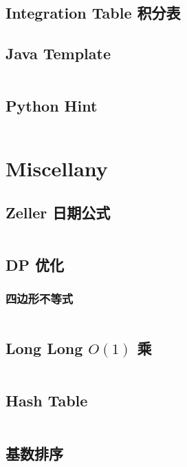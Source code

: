 \documentclass[titlepage, a4paper]{article}
\newcommand\nothing{}
\renewcommand{\checkmark}[0]{\nothing}
\begin{document}
\begin{multicols}{2}
\begin{spacing}{0.6}
\begin{spacing}{0.5}
				\subsection{Integration Table 积分表}
				
				\subsection{Java Template}
				\inputminted{java}{src/Miscellany/Main.java}
				\subsection{Python Hint}
				\inputminted{python}{src/Miscellany/py.py}
				\end{spacing}

			\section{Miscellany}
				\subsection{Zeller 日期公式\checkmark}
				\inputminted{cpp}{src/Miscellany/日期公式.cpp}
				\subsection{DP 优化}
				\subsubsection{四边形不等式\checkmark}
				\inputminted{cpp}{src/Miscellany/2D1D.cpp}
				
				\subsection{Long Long $O(1)$ 乘\checkmark}
				\inputminted{cpp}{src/Miscellany/LLFPM.cpp}
				\subsection{Hash Table}
				\inputminted{cpp}{src/DataStructure/hashmap.cpp}
				\subsection{基数排序}
				\inputminted{cpp}{src/Miscellany/RadixSort.cpp}

\end{spacing}
\end{multicols}
\end{document}
